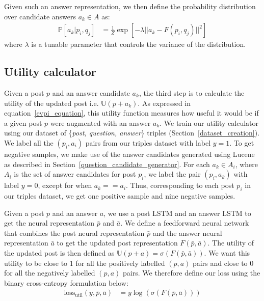 \documentclass[11pt]{report}
\newcommand{\U}{\mathbb{U}}
\begin{document}
Given such an answer representation, we then define the probability distribution over candidate answers $a_k \in A$ as: 
\begin{align}
\mathbb{P}[a_k |p_i,q_j]  
&= \frac 1 Z \exp\left[- \lambda || a_k  -  F(p_i,q_j) ||^2\right]
\end{align}
where $\lambda$ is a tunable parameter that controls the variance of the distribution.

\subsection{Utility calculator}\label{utility_calculator}
Given a post $p$ and an answer candidate $a_k$, the third step is to calculate the utility of the updated post i.e. $\U(p + a_k)$. As expressed in equation~\ref{evpi_equation}, this utility function measures how useful it would be if a given post $p$ were augmented with an answer $a_k$. We train our utility calculator using our dataset of \{\textit{post, question, answer}\} triples (Section~\ref{dataset_creation}). We label all the $(p_i, a_i)$ pairs from our triples dataset with label $y=1$. To get negative samples, we make use of the answer candidates generated using Lucene as described in Section~\ref{question_candidate_generator}. For each $a_k \in A_i$, where $A_i$ is the set of answer candidates for post $p_i$, we label the pair $(p_i, a_k)$ with label $y=0$, except for when $a_k == a_i$. Thus, corresponding to each post $p_i$ in our triples dataset, we get one positive sample and nine negative samples. 

Given a post $p$ and an answer $a$, we use a post LSTM and an answer LSTM to get the neural representation $\bar{p}$ and $\bar{a}$. We define a feedforward neural network that combines the post neural representation $\bar{p}$ and the answer neural representation $\bar{a}$ to get the updated post representation $F(\bar{p}, \bar{a})$. The utility of the updated post is then defined as $\U(p+a) = \sigma ( F(\bar{p}, \bar{a}) )$. We want this utility to be close to 1 for all the positively labelled $(p,a)$ pairs and close to 0 for all the negatively labelled $(p, a)$ pairs. We therefore define our loss using the binary cross-entropy formulation below:
%
\begin{align}\label{eq_utility_calculator}
  \textrm{loss}_{\textrm{util}}(y, \bar p, \bar a) &= y \log(\sigma (F(\bar{p}, \bar{a})))
\end{align}
\end{document}
